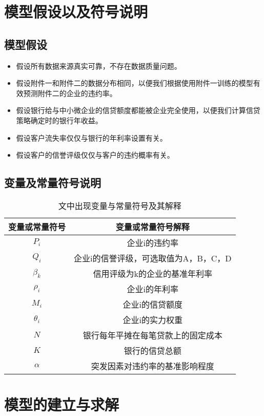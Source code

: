 \documentclass{cumcmthesis}
\begin{document}
\section{模型假设以及符号说明}
\subsection{模型假设}
\begin{itemize}
    \item 假设所有数据来源真实可靠，不存在数据质量问题。
    \item 假设附件一和附件二的数据分布相同，以便我们根据使用附件一训练的模型有效预测附件二的企业的违约率。
    \item 假设银行给与中小微企业的信贷额度都能被企业完全使用，以便我们计算信贷策略确定时的银行年收益。
    \item 假设客户流失率仅仅与银行的年利率设置有关。
    \item 假设客户的信誉评级仅仅与客户的违约概率有关。
\end{itemize}
\subsection{变量及常量符号说明}

\begin{table}[H] 
    
    \label{tablesymbol}
    \centering
    \begin{tabular}{c|c}   
    \hline
    变量或常量符号 & 变量或常量符号解释 \\
    \hline 
    $P_i$ & 企业i的违约率 \\
    $Q_i$ & 企业i的信誉评级，可选取值为A，B，C，D \\
    $\beta_k$ & 信用评级为k的企业的基准年利率 \\
    $\rho_i$ & 企业i的年利率    \\
    $M_i$ & 企业i的信贷额度 \\
    $\theta_i$ & 企业i的实力权重 \\
    $N$ & 银行每年平摊在每笔贷款上的固定成本 \\
    $K$ & 银行的信贷总额 \\
    $\alpha$ & 突发因素对违约率的基准影响程度 \\



    \end{tabular}
    \caption{文中出现变量与常量符号及其解释}
    \end{table}
\section{模型的建立与求解}
\end{document}
